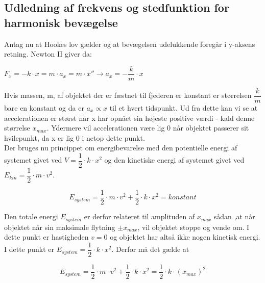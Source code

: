 \subsection{Udledning af frekvens og stedfunktion for harmonisk bevægelse}
Antag nu at Hookes lov gælder og at bevægelsen udelukkende foregår i y-aksens retning. Newton II giver da: 

\bigskip

\begin{center}
$F_x = -k \cdot x = m \cdot a_x = m \cdot x'' \rightarrow a_x = -\dfrac{k}{m} \cdot x$
\end{center}

\bigskip

Hvis massen, m, af objektet der er fæstnet til fjederen er konstant er størrelsen $\dfrac{k}{m}$ bare en konstant og da er $a_x \propto x$ til et hvert tidspunkt. Ud fra dette kan vi se at accelerationen er størst når x har opnået sin højeste positive værdi - kald denne størrelse $x_{max}$. Ydermere vil accelerationen være lig 0 når objektet passerer sit hvilepunkt, da x er lig 0 i netop dette punkt.
\\

Der bruges nu princippet om energibevarelse med den potentielle energi af systemet givet ved $V=\dfrac{1}{2} \cdot k \cdot x^2$ og den kinetiske energi af systemet givet ved $E_{kin} = \dfrac{1}{2} \cdot m \cdot v^2$.

\bigskip

\begin{center}
\begin{equation}
E_{system}=\dfrac{1}{2} \cdot m \cdot v^2 + \dfrac{1}{2} \cdot k \cdot x^2 = konstant
\end{equation}
\end{center}

Den totale energi $E_{system}$ er derfor  relateret til amplituden af $x_{max}$ sådan ,at når objektet når sin maksimale flytning $\pm x_{max}$, vil objektet stoppe og vende om. I dette punkt er hastigheden $v = 0$ og objektet har altså ikke nogen kinetisk energi. I dette punkt er $E_{system } = \dfrac{1}{2} \cdot k \cdot x^2$. Derfor må det gælde at

\bigskip
\begin{center}
\begin{equation}
E_{system}=\dfrac{1}{2} \cdot m \cdot v^2 + \dfrac{1}{2} \cdot k \cdot x^2 = \dfrac{1}{2} \cdot k \cdot (x_{max})^2
\end{equation}
\end{center}
\bigskip

